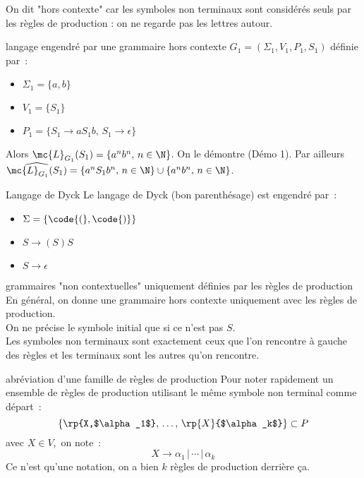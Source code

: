 \begin{adjustwidth}{-3cm}{-3cm}
\begin{remarque}{}{}
    On dit "hors contexte" car les symboles non terminaux sont considérés seuls par les règles de production : on ne regarde pas les lettres autour.
\end{remarque}

\newcommand{\leng}[2]{\mc{L}_{#1}(#2)}


\begin{exemple}{}{langage engendré par une grammaire hors contexte}
    $G_1 = (\Sigma_1, V_1, P_1, S_1)$ définie par~:
    \begin{itemize}
        \item $\Sigma_1 = \{a,b\}$
        \item $V_1 = \{S_1\}$
        \item $P_1 = \{S_1 \rightarrow a S_1 b,\,S_1\rightarrow \epsilon\}$
    \end{itemize}
    Alors $\mc{L}_{G_1}(S_1) = \{a^nb^n,\, n \in \N\}$. On le démontre (Démo 1).
    Par ailleurs $\widehat{\mc{L}_{G_1}(S_1)} = \{a^n S_1 b^n,\, n \in \N\} \cup \{a^n b^n ,\, n \in \N\}$.
\end{exemple}

\begin{exemple}{}{Langage de Dyck}
    Le langage de Dyck (bon parenthésage) est engendré par~:
    \begin{itemize}
        \item $\Sigma = \{\code{(}, \code{)}\}$
        \item $S \rightarrow {(S)S}$
        \item $S \rightarrow \epsilon$
    \end{itemize}
\end{exemple}

\begin{remarque}{}{grammaires "non contextuelles" uniquement définies par les règles de production}
    En général, on donne une grammaire hors contexte uniquement avec les règles de production.\\
    On ne précise le symbole initial que si ce n'est pas $S$.\\
    Les symboles non terminaux sont exactement ceux que l'on rencontre à gauche des règles et les terminaux sont les autres qu'on rencontre.
\end{remarque}

\begin{remarque}{}{abréviation d'une famille de règles de production}
    Pour noter rapidement un ensemble de règles de production utilisant le même symbole non terminal comme départ~:
    $$\{\rp{X,$\alpha_1$},\, \dots,\, \rp{X}{$\alpha_k$}\} \subset P$$
    avec $X\in V$,\, on note~:
    $$X \rightarrow \alpha_1 \,\vert\, \cdots \,\vert\, \alpha_k$$
    Ce n'est qu'une notation, on a bien $k$ règles de production derrière ça.
\end{remarque}


\end{adjustwidth}
